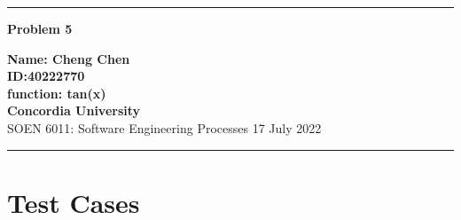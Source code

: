 \documentclass[10pt,a4paper,twoside]{article}
\begin{document}
\begin{center}
\hrule

\vspace{.4cm}
{\bf {\Huge Problem 5}}
\vspace{.2cm}
\end{center}
{\bf Name: Cheng Chen}  \\
{\bf ID:40222770}\\
{\bf function: tan(x)}\\
{\bf Concordia University}\\
SOEN 6011: Software Engineering Processes {\bf  } \hspace{\fill}  17 July  2022 \\
\hrule







\section{Test Cases}
\end{document}
